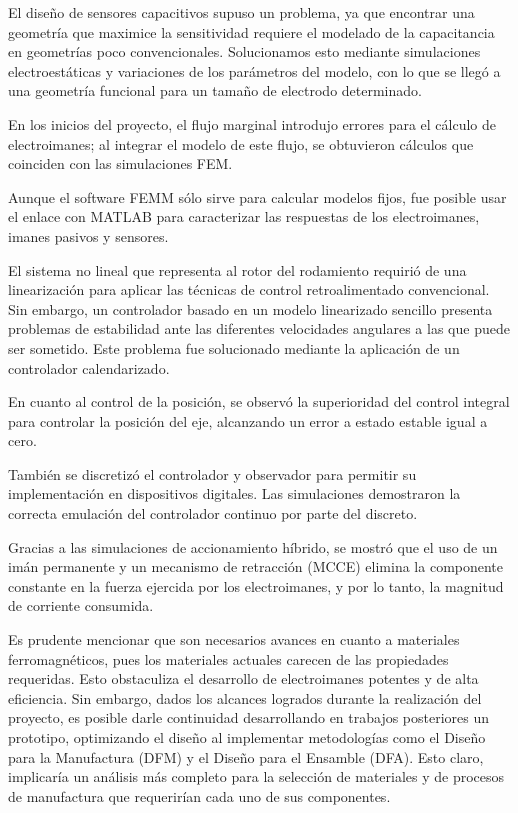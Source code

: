 El dise\~no de sensores capacitivos supuso un problema, ya que encontrar una geometr\'ia que maximice la sensitividad requiere el modelado de la capacitancia en geometr\'ias poco convencionales. Solucionamos esto mediante simulaciones electroestáticas y variaciones de los par\'ametros del modelo, con lo que se lleg\'o a una geometr\'ia funcional para un tama\~no de electrodo determinado.

En los inicios del proyecto, el flujo marginal introdujo errores para el c\'alculo de electroimanes; al integrar el modelo de este flujo, se obtuvieron c\'alculos que coinciden con las simulaciones FEM.

Aunque el software FEMM s\'olo sirve para calcular modelos fijos, fue posible usar el enlace con MATLAB para caracterizar las respuestas de los electroimanes, imanes pasivos y sensores.

El sistema no lineal que representa al rotor del rodamiento requiri\'o de una linearizaci\'on para aplicar las t\'ecnicas de control retroalimentado convencional. Sin embargo, un controlador basado en un modelo linearizado sencillo presenta problemas de estabilidad ante las diferentes velocidades angulares a las que puede ser sometido. Este problema fue solucionado mediante la aplicaci\'on de un controlador calendarizado.

En cuanto al control de la posici\'on, se observ\'o la superioridad del control integral para controlar la posici\'on del eje, alcanzando un error a estado estable igual a cero.

Tambi\'en se discretiz\'o el controlador y observador para permitir su implementaci\'on en dispositivos digitales. Las simulaciones demostraron la correcta emulaci\'on del controlador continuo por parte del discreto.

Gracias a las simulaciones de accionamiento h\'ibrido, se mostr\'o que el uso de un im\'an permanente y un mecanismo de retracci\'on (MCCE) elimina la componente constante en la fuerza ejercida por los electroimanes, y por lo tanto, la magnitud de corriente consumida.

Es prudente mencionar que son necesarios avances en cuanto a materiales ferromagn\'eticos, pues los materiales actuales carecen de las propiedades requeridas. Esto obstaculiza el desarrollo de electroimanes potentes y de alta eficiencia. Sin embargo, dados los alcances logrados durante la realizaci\'on del proyecto, es posible darle continuidad desarrollando en trabajos posteriores un prototipo, optimizando el dise\~no al implementar metodolog\'ias como el Dise\~no para la Manufactura (DFM) y el Dise\~no para el Ensamble (DFA). Esto claro, implicar\'ia un an\'alisis m\'as completo para la selecci\'on de materiales y de procesos de manufactura que requerir\'ian cada uno de sus componentes. 
